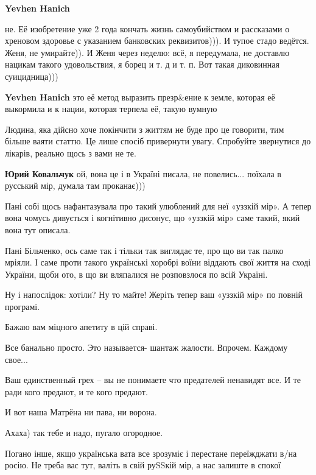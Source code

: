 \begin{itemize}
\begin{itemize} %
\textbf{Yevhen Hanich} 

не. Её изобретение уже 2 года кончать жизнь самоубийством и рассказами о
хреновом здоровье с указанием банковских реквизитов))). И тупое стадо
ведётся. Женя, не умирайте)). И Женя через неделю: всё, я передумала, не доставлю
нацикам такого удовольствия, я борец и т. д и т. п. Вот такая диковинная
суицидница)))


\textbf{Yevhen Hanich} это её метод выразить презр\&ение к земле, которая её выкормила и к нации, которая терпела её, такую вумную
\end{itemize} %


Людина, яка дійсно хоче покінчити з життям не буде про це говорити, тим більше
ваяти статтю. Це лише спосіб привернути увагу. Спробуйте звернутися до лікарів,
реально щось з вами не те.

\textbf{Юрий Ковальчук} ой, вона це і в Україні писала, не повелись... поїхала в русський мір, думала там проканає)))


Пані собі щось нафантазувала про такий улюблений для неї «уззкій мір». А тепер
вона чомусь дивується і когнітивно дисонує, що «уззкій мір» саме такий, який
вона тут описала.

Пані Більченко, ось саме так і тільки так виглядає те, про що ви так палко
мріяли. І саме проти такого українські хоробрі воїни віддають свої життя на
сході України, щоби ото, в що ви вляпалися не розповзлося по всій Україні.

Ну і напослідок: хотіли? Ну то майте! Жеріть тепер ваш «уззкій мір» по повній
програмі.

Бажаю вам міцного апетиту в цій справі.

Все банально просто. Это называется- шантаж жалости. Впрочем. Каждому свое...

Ваш единственный грех – вы не понимаете что предателей ненавидят все.
И те ради кого предают, и те кого предают.

И вот наша Матрёна ни пава, ни ворона.

Ахаха) так тебе и надо, пугало огородное.


Погано інше, якщо українська вата все зрозуміє і перестане переїжджати в/на
росію. Не треба вас тут, валіть в свій руSSкій мір, а нас залиште в спокої


\end{itemize}
